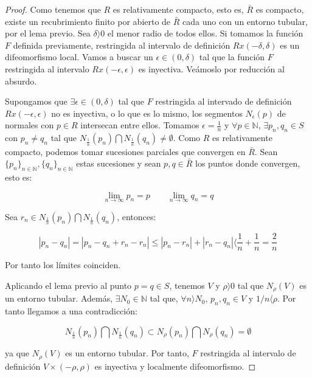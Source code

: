 \begin{proof}
Como tenemos que $R$ es relativamente compacto, esto es, $\bar{R}$ es compacto, existe un recubrimiento finito por abierto de $\bar{R}$ cada uno con un entorno tubular, por el lema previo. Sea $\delta  \rangle  0$ el menor radio de todos ellos. Si tomamos la función $F$ definida previamente, restringida al intervalo de definición $Rx(-\delta, \delta)$ es un difeomorfismo local. Vamos a buscar un $\epsilon \in (0,\delta)$ tal que la función $F$ restringida al intervalo $Rx(-\epsilon, \epsilon)$ es inyectiva. Veámoslo por reducción al absurdo.

Supongamos que $\exists \epsilon \in (0,\delta)$ tal que $F$ restringida al intervado de definición $Rx(-\epsilon, \epsilon)$ no es inyectiva, o lo que es lo mismo, los segmentos $N_\epsilon(p)$ de normales con $p \in R$ intersecan entre ellos. Tomamos $\epsilon=\frac{1}{n}$ y $\forall p \in \mathbb{N}$, $\exists p_n,q_n \in S$ con $p_n \neq q_n$ tal que $N_{\frac{1}{n}}(p_n) \bigcap N_{\frac{1}{n}}(q_n) \neq \emptyset$.
Como $R$ es relativamente compacto, podemos tomar sucesiones parciales que convergen en $\bar{R}$. Sean $\{p_n\}_{n \in \mathbb{N}}, \{q_n\}_{n \in \mathbb{N}}$ estas sucesiones y sean $p,q \in \bar{R}$ los puntos donde convergen, esto es:

\begin{equation*}
    \lim_{n\to\infty} p_n = p \qquad \lim_{n\to\infty} q_n = q
\end{equation*}

Sea $r_n \in N_{\frac{1}{n}}(p_n) \bigcap N_{\frac{1}{n}}(q_n)$, entonces:

\begin{equation*}
    |p_n - q_n| = |p_n - q_n + r_n - r_n| \leq |p_n-r_n| + |r_n-q_n|  \langle  \frac{1}{n}+\frac{1}{n} = \frac{2}{n}
\end{equation*}

Por tanto los límites coinciden.

Aplicando el lema previo al punto $p = q \in S$, tenemos $V$ y $\rho  \rangle  0$ tal que $N_\rho(V)$ es un entorno tubular. Además, $\exists N_0 \in \mathbb{N}$ tal que, $\forall n  \rangle  N_0$, $p_n,q_n \in V$ y $1/n  \langle  \rho$. Por tanto llegamos a una contradicción:

\begin{equation*}
    N_{\frac{1}{n}}(p_n) \bigcap N_{\frac{1}{n}}(q_n) \subset N_\rho(p_n)\bigcap N_\rho(q_n) = \emptyset
\end{equation*}

ya que $N_\rho(V)$ es un entorno tubular. Por tanto, $F$ restringida al intervalo de definición $V \times (-\rho, \rho)$ es inyectiva y localmente difeomorfismo.

\end{proof}

